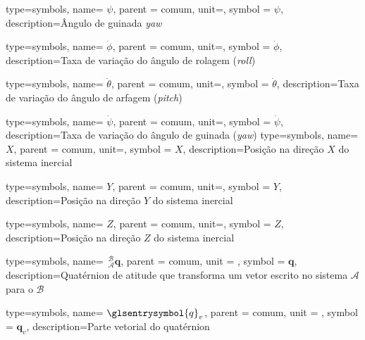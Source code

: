 {type=symbols,
  name= \ensuremath{\psi},
  parent = {comum},
  unit=\unexpanded{\si{\radian}},
  symbol = \ensuremath{\psi},
  description={Ângulo de guinada \emph{yaw}}
}

{type=symbols,
  name= \ensuremath{\dot\phi},
  parent = {comum},
  unit=\unexpanded{\si{\radian\per\second}},
  symbol = \ensuremath{\dot\phi},
  description={Taxa de variação do ângulo de rolagem (\emph{roll})}
}

{type=symbols,
  name= \ensuremath{\dot\theta},
  parent = {comum},
  unit=\unexpanded{\si{\radian\per\second}},
  symbol = \ensuremath{\dot\theta},
  description={Taxa de variação do ângulo de arfagem (\emph{pitch})}
}

{type=symbols,
  name= \ensuremath{\dot\psi},
  parent = {comum},
  unit=\unexpanded{\si{\radian\per\second}},
  symbol = \ensuremath{\dot\psi},
  description={Taxa de variação do ângulo de guinada (\emph{yaw})}
}
{type=symbols,
  name= \ensuremath{X},
  parent = {comum},
  unit=\unexpanded{\si{\meter}},
  symbol = \ensuremath{X},
  description={Posição na direção \ensuremath{X} do sistema inercial}
}

{type=symbols,
  name= \ensuremath{Y},
  parent = {comum},
  unit=\unexpanded{\si{\meter}},
  symbol = \ensuremath{Y},
  description={Posição na direção \ensuremath{Y} do sistema inercial}
}

{type=symbols,
  name= \ensuremath{Z},
  parent = {comum},
  unit=\unexpanded{\si{\meter}},
  symbol = \ensuremath{Z},
  description={Posição na direção \ensuremath{Z} do sistema inercial}
}

{type=symbols,
  name= \ensuremath{\,{}_{\mathcal{A}}^{\mathcal{B}}\mathbf{q}},
  parent = {comum},
  unit = {},
  symbol = \ensuremath{\mathbf{q}},
  description={Quatérnion de atitude que transforma um vetor escrito no sistema \ensuremath{\mathcal{A}} para o \ensuremath{\mathcal{B}}}
}

{type=symbols,
  name= \ensuremath{\glsentrysymbol{q}_v},
  parent = {comum},
  unit = {},
  symbol = \ensuremath{\mathbf{q}_v},
  description={Parte vetorial do quatérnion }
}

